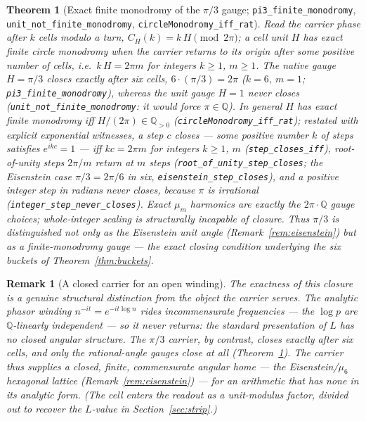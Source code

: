 \documentclass[11pt]{article}
\newtheorem{theorem}[definition]{Theorem}
\newtheorem{remark}[definition]{Remark}
\newcommand{\Q}{\mathbb{Q}}
\newcommand{\code}[1]{\texttt{#1}}
\begin{document}
\begin{theorem}[Exact finite monodromy of the $\pi/3$ gauge; \code{pi3\_finite\_monodromy}, \code{unit\_not\_finite\_monodromy}, \code{circleMonodromy\_iff\_rat}]\label{thm:monodromy}
Read the carrier phase after $k$ cells modulo a turn, $C_H(k)=k\,H \pmod{2\pi}$; a cell unit $H$ has
\emph{exact finite circle monodromy} when the carrier returns to its origin after some positive number
of cells, i.e.\ $k\,H=2\pi m$ for integers $k\ge1$, $m\ge1$. The native gauge $H=\pi/3$ closes
\emph{exactly} after six cells, $6\cdot(\pi/3)=2\pi$ ($k=6$, $m=1$; \code{pi3\_finite\_monodromy}),
whereas the unit gauge $H=1$ never closes (\code{unit\_not\_finite\_monodromy}: it would force $\pi\in\Q$).
In general $H$ has exact finite monodromy \emph{iff} $H/(2\pi)\in\Q_{>0}$
(\code{circleMonodromy\_iff\_rat}); restated with explicit exponential witnesses, a step $c$ closes
--- some positive number $k$ of steps satisfies $e^{ikc}=1$ --- iff $kc=2\pi m$ for integers
$k\ge1$, $m$ (\code{step\_closes\_iff}), root-of-unity steps $2\pi/m$ return at $m$ steps
(\code{root\_of\_unity\_step\_closes}; the Eisenstein case $\pi/3=2\pi/6$ in six,
\code{eisenstein\_step\_closes}), and a positive \emph{integer} step in radians never closes,
because $\pi$ is irrational (\code{integer\_step\_never\_closes}).  Exact $\mu_m$ harmonics are
exactly the $2\pi\cdot\Q$ gauge choices; whole-integer scaling is structurally incapable of
closure.  Thus $\pi/3$ is distinguished not only as the Eisenstein unit angle
(Remark~\ref{rem:eisenstein}) but as a \emph{finite-monodromy} gauge --- the exact closing condition
underlying the six buckets of Theorem~\ref{thm:buckets}.
\end{theorem}

\begin{remark}[A closed carrier for an open winding]\label{rem:closedvsopen}
The exactness of this closure is a genuine structural distinction from the object the carrier serves.
The analytic phasor winding $n^{-it}=e^{-it\log n}$ rides incommensurate frequencies --- the $\log p$ are
$\Q$-linearly independent --- so it never returns: the standard presentation of $L$ has no closed angular
structure. The $\pi/3$ carrier, by contrast, closes \emph{exactly} after six cells, and only the
rational-angle gauges close at all (Theorem~\ref{thm:monodromy}). The carrier thus supplies a closed,
finite, commensurate angular home --- the Eisenstein/$\mu_6$ hexagonal lattice
(Remark~\ref{rem:eisenstein}) --- for an arithmetic that has none in its analytic form. (The cell
enters the readout as a unit-modulus factor, divided out to recover the $L$-value in Section~\ref{sec:strip}.)
\end{remark}
\end{document}
